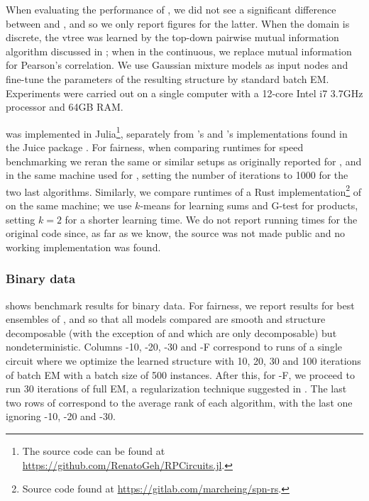 When evaluating the performance of , we did not see a significant difference
between  and , and so we only report figures for the latter.
When the domain is discrete, the vtree was learned by the top-down pairwise mutual information
algorithm discussed in ; when in the continuous, we replace mutual
information for Pearson's correlation. We use Gaussian mixture models as input nodes and fine-tune
the parameters of the resulting structure by standard batch EM. Experiments were carried out on a
single computer with a 12-core Intel i7 3.7GHz processor and 64GB RAM.

 was implemented in Julia\footnote{The source code can be found at
\url{https://github.com/RenatoGeh/RPCircuits.jl}.}, separately from 's and
's implementations found in the Juice package \citep{dang21}. For fairness,
when comparing runtimes for speed benchmarking we reran the same or similar setups as originally
reported for ,  and  in the same machine used
for , setting the number of iterations to 1000 for the two last \incrclass{}
algorithms. Similarly, we compare runtimes of a Rust implementation\footnote{Source code found at
\url{https://gitlab.com/marcheing/spn-rs}.} of  on the same machine; we use
$k$-means for learning sums and G-test for products, setting $k=2$ for a shorter learning time. We
do not report running times for the original  code since, as far as we know,
the source was not made public and no working implementation was found.

\subsubsection{Binary data}

 shows benchmark results for binary data. For fairness, we report results for best
ensembles of ,  and  so that all models
compared are smooth and structure decomposable (with the exception of  and
 which are only decomposable) but nondeterministic. Columns
-10, -20, -30 and -F
correspond to runs of a single  circuit where we optimize the learned structure
with 10, 20, 30 and 100 iterations of batch EM with a batch size of 500 instances. After this, for
-F, we proceed to run 30 iterations of full EM, a regularization technique
suggested in \citet{liu21}. The last two rows of  correspond to the average rank
of each algorithm, with the last one ignoring -10, -20 and
-30.

